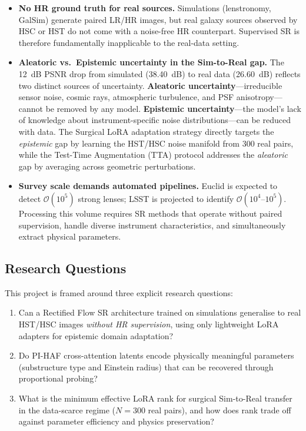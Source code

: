 \documentclass[11pt,a4paper]{article}
\begin{document}
\begin{itemize}
  \item \textbf{No HR ground truth for real sources.} Simulations (lenstronomy, GalSim) generate paired LR/HR images, but real galaxy sources observed by HSC or HST do not come with a noise-free HR counterpart. Supervised SR is therefore fundamentally inapplicable to the real-data setting.

  \item \textbf{Aleatoric vs.\ Epistemic uncertainty in the Sim-to-Real gap.} The 12~dB PSNR drop from simulated (38.40~dB) to real data (26.60~dB) reflects two distinct sources of uncertainty. \textbf{Aleatoric uncertainty}---irreducible sensor noise, cosmic rays, atmospheric turbulence, and PSF anisotropy---cannot be removed by any model. \textbf{Epistemic uncertainty}---the model's lack of knowledge about instrument-specific noise distributions---can be reduced with data. The Surgical LoRA adaptation strategy directly targets the \emph{epistemic} gap by learning the HST/HSC noise manifold from 300 real pairs, while the Test-Time Augmentation (TTA) protocol addresses the \emph{aleatoric} gap by averaging across geometric perturbations.

  \item \textbf{Survey scale demands automated pipelines.} Euclid is expected to detect $\mathcal{O}(10^5)$ strong lenses; LSST is projected to identify $\mathcal{O}(10^4\text{--}10^5)$. Processing this volume requires SR methods that operate without paired supervision, handle diverse instrument characteristics, and simultaneously extract physical parameters.
\end{itemize}

\subsection{Research Questions}

This project is framed around three explicit research questions:

\begin{enumerate}
  \item[\textbf{RQ1.}] Can a Rectified Flow SR architecture trained on simulations generalise to real HST/HSC images \emph{without HR supervision}, using only lightweight LoRA adapters for epistemic domain adaptation?

  \item[\textbf{RQ2.}] Do PI-HAF cross-attention latents encode physically meaningful parameters (substructure type and Einstein radius) that can be recovered through proportional probing?

  \item[\textbf{RQ3.}] What is the minimum effective LoRA rank for surgical Sim-to-Real transfer in the data-scarce regime ($N=300$ real pairs), and how does rank trade off against parameter efficiency and physics preservation?
\end{enumerate}
\end{document}
